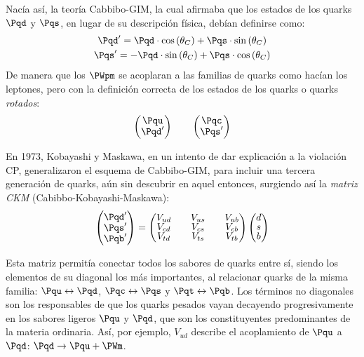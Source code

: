 Nacía así, la teoría Cabbibo-GIM, la cual afirmaba que los estados de los quarks $\Pqd$ y $\Pqs$, en lugar de su descripción física, debían definirse como:
\begin{equation}
\begin{gathered}
\Pqd'=\Pqd \cdot \cos \left( \theta _{C}\right) + \Pqs \cdot \sin \left( \theta _{C}\right) \\
\Pqs'= - \Pqd \cdot \sin \left( \theta _{C}\right) + \Pqs \cdot \cos \left( \theta_C\right)
\end{gathered}
\end{equation}
De manera que los $\PWpm$ se acoplaran a las familias de quarks como hacían los leptones, pero con la definición correcta de los estados de los quarks o quarks \textit{rotados}:
\begin{align}
\begingroup 
\renewcommand*{\arraystretch}{0.8}
\setlength\arraycolsep{10pt}
\begin{pmatrix} \Pqu \\ \Pqd' \end{pmatrix} \qquad
\begin{pmatrix} \Pqc \\ \Pqs' \end{pmatrix}
\endgroup
\end{align}

En 1973, Kobayashi y Maskawa, en un intento de dar explicación a la violación CP, generalizaron el esquema de Cabbibo-GIM, para incluir una tercera generación de quarks, aún sin descubrir en aquel entonces, surgiendo así la \textit{matriz CKM} (Cabibbo-Kobayashi-Maskawa):
\begin{equation}
\begingroup 
\renewcommand*{\arraystretch}{0.8}
\setlength\arraycolsep{10pt}
\begin{pmatrix} \Pqd' \\ \Pqs' \\ \Pqb' \end{pmatrix} =\begin{pmatrix} V_{ud} & V_{us} & V_{ub} \\ V_{cd} & V_{cs} & V_{cb} \\ V_{td} & V_{ts} & V_{tb} \end{pmatrix}\begin{pmatrix} d \\ s \\ b \end{pmatrix}
\endgroup\label{eq:CKM}
\end{equation}

Esta matriz permitía conectar todos los sabores de quarks entre sí, siendo los elementos de su diagonal los más importantes, al relacionar quarks de la misma familia: $\Pqu \leftrightarrow \Pqd$, $\Pqc \leftrightarrow \Pqs$ y $\Pqt \leftrightarrow \Pqb$. Los términos no diagonales son los responsables de que los quarks pesados vayan decayendo progresivamente en los sabores ligeros $\Pqu$ y $\Pqd$, que son los constituyentes predominantes de la materia ordinaria. Así, por ejemplo, $V_{ud}$ describe el acoplamiento de $\Pqu$ a $\Pqd$: $\Pqd \rightarrow \Pqu + \PWm$.

